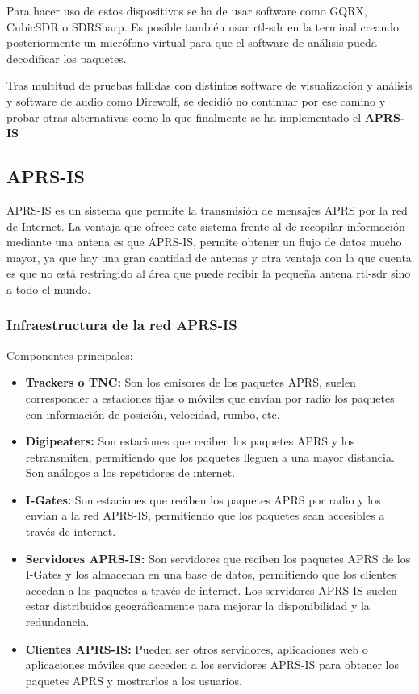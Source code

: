 Para hacer uso de estos dispositivos se ha de usar software como GQRX, CubicSDR o SDRSharp. Es posible también usar rtl-sdr en la terminal creando posteriormente un micrófono virtual para que el software de análisis pueda decodificar los paquetes.

Tras multitud de pruebas fallidas con distintos software de visualización y análisis y software de audio como Direwolf, se decidió no continuar por ese camino y probar otras alternativas como la que finalmente se ha implementado el \textbf{APRS-IS}

\subsection*{APRS-IS}
APRS-IS es un sistema que permite la transmisión de mensajes APRS por la red de Internet. La ventaja que ofrece este sistema frente al de recopilar información mediante una antena es que APRS-IS, permite obtener un flujo de datos mucho mayor, ya que hay una gran cantidad de antenas y otra ventaja con la que cuenta es que no está restringido al área que puede recibir la pequeña antena rtl-sdr sino a todo el mundo.


\subsubsection*{Infraestructura de la red APRS-IS}
Componentes principales:
\begin{itemize}
	\item \textbf{Trackers o TNC:} Son los emisores de los paquetes APRS, suelen corresponder a estaciones fijas o móviles que envían por radio los paquetes con información de posición, velocidad, rumbo, etc.
	\item \textbf{Digipeaters:} Son estaciones que reciben los paquetes APRS y los retransmiten, permitiendo que los paquetes lleguen a una mayor distancia. Son análogos a los repetidores de internet.
	\item \textbf{I-Gates:} Son estaciones que reciben los paquetes APRS por radio y los envían a la red APRS-IS, permitiendo que los paquetes sean accesibles a través de internet.
	\item \textbf{Servidores APRS-IS:} Son servidores que reciben los paquetes APRS de los I-Gates y los almacenan en una base de datos, permitiendo que los clientes accedan a los paquetes a través de internet. Los servidores APRS-IS suelen estar distribuidos geográficamente para mejorar la disponibilidad y la redundancia.
	\item \textbf{Clientes APRS-IS:} Pueden ser otros servidores, aplicaciones web o aplicaciones móviles que acceden a los servidores APRS-IS para obtener los paquetes APRS y mostrarlos a los usuarios.
\end{itemize}

